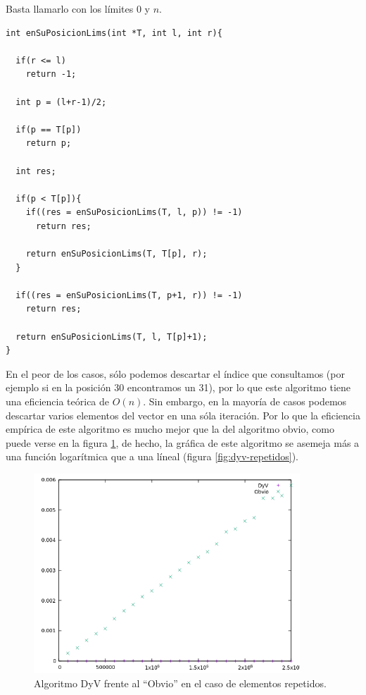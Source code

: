 \documentclass[a4]{article}
\begin{document}
Basta llamarlo con los límites 0 y $n$.

\begin{lstlisting}
int enSuPosicionLims(int *T, int l, int r){

  if(r <= l)
    return -1;
  
  int p = (l+r-1)/2;
  
  if(p == T[p])
    return p;

  int res;
    
  if(p < T[p]){
    if((res = enSuPosicionLims(T, l, p)) != -1)
      return res;
   
    return enSuPosicionLims(T, T[p], r);
  }
    
  if((res = enSuPosicionLims(T, p+1, r)) != -1)
    return res;
      
  return enSuPosicionLims(T, l, T[p]+1);
}
\end{lstlisting}

En el peor de los casos, sólo podemos descartar el índice que
consultamos (por ejemplo si en la posición 30 encontramos un 31), por
lo que este algoritmo tiene una eficiencia teórica de $O(n)$. Sin
embargo, en la mayoría de casos podemos descartar varios elementos del
vector en una sóla iteración. Por lo que la eficiencia empírica de
este algoritmo es mucho mejor que la del algoritmo obvio, como puede
verse en la figura \ref{fig:comp-repetidos}, de hecho, la gráfica de
este algoritmo se asemeja más a una función logarítmica que a una
líneal (figura \ref{fig:dyv-repetidos}).

\begin{figure}[H]
  \centering
  \caption{Algoritmo DyV frente al ``Obvio'' en el caso de elementos repetidos.}
  \label{fig:comp-repetidos}
  \includegraphics[width=100mm]{graficos/comparacion_Repetidos}
\end{figure}
\end{document}
